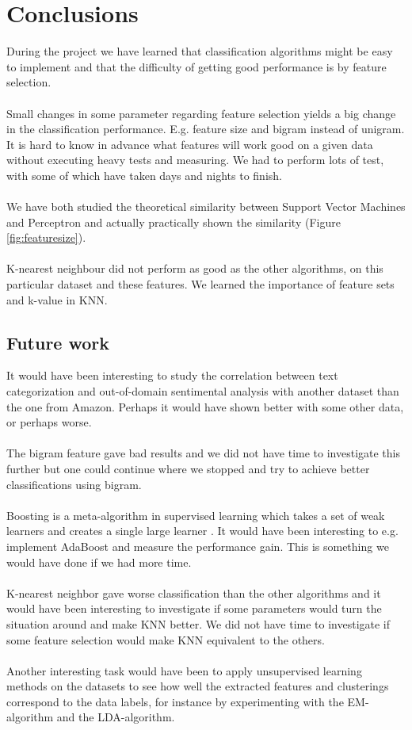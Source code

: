 \chapter{Conclusions}
During the project we have learned that classification algorithms might be easy to implement and that the difficulty of getting good performance is by feature selection. \\\\
Small changes in some parameter regarding feature selection yields a big change in the classification performance. E.g. feature size and bigram instead of unigram. It is hard to know in advance what features will work good on a given data without executing heavy tests and measuring. We had to perform lots of test, with some of which have taken days and nights to finish. 
\\\\
We have both studied the theoretical similarity between Support Vector Machines and Perceptron and actually practically shown the similarity (Figure \ref{fig:featuresize}).
\\\\
K-nearest neighbour did not perform as good as the other algorithms, on this particular dataset and these features. We learned the importance of feature sets and k-value in KNN.
\section{Future work}
It would have been interesting to study the correlation between text categorization and out-of-domain sentimental analysis with another dataset than the one from Amazon. Perhaps it would have shown better with some other data, or perhaps worse.  \\\\
The bigram feature gave bad results and we did not have time to investigate this further but one could continue where we stopped and try to achieve better classifications using bigram.  \\\\
Boosting is a meta-algorithm in supervised learning which takes a set of weak learners and creates a single large learner \citep{boosting}. It would have been interesting to e.g. implement AdaBoost and measure the performance gain. This is something we would have done if we had more time. \\\\
K-nearest neighbor gave worse classification than the other algorithms and it would have been interesting to investigate if some parameters would turn the situation around and make KNN better. We did not have time to investigate if some feature selection would make KNN equivalent to the others.
\\\\
Another interesting task would have been to apply unsupervised learning methods on the datasets to see how well the extracted features and clusterings correspond to the data labels, for instance by experimenting with the EM-algorithm and the LDA-algorithm.
